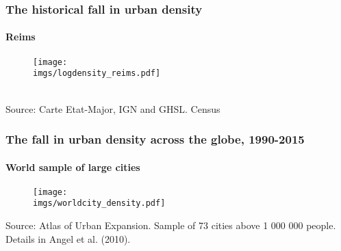\documentclass[aspectratio=169]{beamer}
\begin{document}
\begin{frame}[label=Reims]
\frametitle{The historical fall in urban density}
\framesubtitle{Reims}
\begin{figure}
	\begin{center}
		\texttt{[image: \\imgs/logdensity\_reims.pdf]}
	\end{center}
\end{figure}
\hyperlink{density}{}\\
{\tiny Source: Carte Etat-Major, IGN and GHSL. Census}
\end{frame}

\begin{frame}[label=world_sample_city]
\frametitle{The fall in urban density across the globe, 1990-2015}
\framesubtitle{World sample of large cities}
\begin{figure}
	\begin{center}
		\texttt{[image: \\imgs/worldcity\_density.pdf]}
	\end{center}
\end{figure}
{\tiny Source: Atlas of Urban Expansion. Sample of 73 cities above 1 000 000 people. Details in Angel et al. (2010).}\\
\hyperlink{density}{}
\end{frame}


\end{document}
